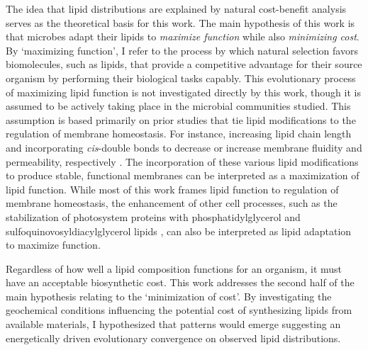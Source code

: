 The idea that lipid distributions are explained by natural cost-benefit analysis serves as the theoretical basis for this work. The main hypothesis of this work is that microbes adapt their lipids to \textit{maximize function} while also \textit{minimizing cost}. By `maximizing function', I refer to the process by which natural selection favors biomolecules, such as lipids, that provide a competitive advantage for their source organism by performing their biological tasks capably. This evolutionary process of maximizing lipid function is not investigated directly by this work, though it is assumed to be actively taking place in the microbial communities studied. This assumption is based primarily on prior studies that tie lipid modifications to the regulation of membrane homeostasis. For instance, increasing lipid chain length and incorporating \textit{cis}-double bonds to decrease or increase membrane fluidity and permeability, respectively \citep[see review by][]{zhang2008membrane}. The incorporation of these various lipid modifications to produce stable, functional membranes can be interpreted as a maximization of lipid function. While most of this work frames lipid function to regulation of membrane homeostasis, the enhancement of other cell processes, such as the stabilization of photosystem proteins with phosphatidylglycerol and sulfoquinovosyldiacylglycerol lipids \citep{sato2004roles}, can also be interpreted as lipid adaptation to maximize function.

Regardless of how well a lipid composition functions for an organism, it must have an acceptable biosynthetic cost. This work addresses the second half of the main hypothesis relating to the `minimization of cost'. By investigating the geochemical conditions influencing the potential cost of synthesizing lipids from available materials, I hypothesized that patterns would emerge suggesting an energetically driven evolutionary convergence on observed lipid distributions. %



